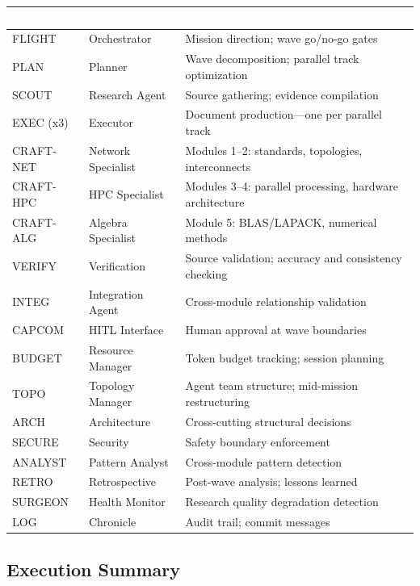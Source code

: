 \documentclass[11pt,letterpaper]{article}
\newcommand{\tableheader}[1]{\textbf{\sffamily\textcolor{white}{#1}}}
\begin{document}
\begin{center}
\begin{tabularx}{\textwidth}{L{2cm}L{2.5cm}X}
\toprule
{}
\tableheader{Role} & \tableheader{Agent} & \tableheader{Responsibility} \\
\midrule
FLIGHT & Orchestrator & Mission direction; wave go/no-go gates \\
PLAN & Planner & Wave decomposition; parallel track optimization \\
SCOUT & Research Agent & Source gathering; evidence compilation \\
EXEC (x3) & Executor & Document production---one per parallel track \\
CRAFT-NET & Network Specialist & Modules 1--2: standards, topologies, interconnects \\
CRAFT-HPC & HPC Specialist & Modules 3--4: parallel processing, hardware architecture \\
CRAFT-ALG & Algebra Specialist & Module 5: BLAS/LAPACK, numerical methods \\
VERIFY & Verification & Source validation; accuracy and consistency checking \\
INTEG & Integration Agent & Cross-module relationship validation \\
CAPCOM & HITL Interface & Human approval at wave boundaries \\
BUDGET & Resource Manager & Token budget tracking; session planning \\
TOPO & Topology Manager & Agent team structure; mid-mission restructuring \\
ARCH & Architecture & Cross-cutting structural decisions \\
SECURE & Security & Safety boundary enforcement \\
ANALYST & Pattern Analyst & Cross-module pattern detection \\
RETRO & Retrospective & Post-wave analysis; lessons learned \\
SURGEON & Health Monitor & Research quality degradation detection \\
LOG & Chronicle & Audit trail; commit messages \\
\bottomrule
\end{tabularx}
\end{center}

\subsection{Execution Summary}
\end{document}
